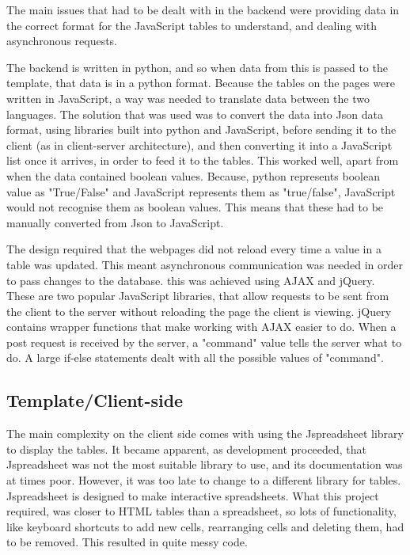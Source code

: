 \documentclass{l4proj}
\begin{document}
The main issues that had to be dealt with in the backend were providing data in the correct format for the JavaScript tables to understand, and dealing with asynchronous requests.

The backend is written in python, and so when data from this is passed to the template, that data is in a python format. Because the tables on the pages were written in JavaScript, a way was needed to translate data between the two languages. The solution that was used was to convert the data into Json data format, using libraries built into python and JavaScript, before sending it to the client (as in client-server architecture), and then converting it into a JavaScript list once it arrives, in order to feed it to the tables. This worked well, apart from when the data contained boolean values. Because, python represents boolean value as "True/False" and JavaScript represents them as "true/false", JavaScript would not recognise them as boolean values. This means that these had to be manually converted from Json to JavaScript.

The design required that the webpages did not reload every time a value in a table was updated. This meant asynchronous communication was needed in order to pass changes to the database. this was achieved using AJAX and jQuery. These are two popular JavaScript libraries, that allow requests to be sent from the client to the server without reloading the page the client is viewing. jQuery contains wrapper functions that make working with AJAX easier to do. When a post request is received by the server, a "command" value tells the server what to do. A large if-else statements dealt with all the possible values of "command".

\subsection{Template/Client-side}

The main complexity on the client side comes with using the Jspreadsheet library to display the tables. It became apparent, as development proceeded, that Jspreadsheet was not the most suitable library to use, and its documentation was at times poor. However, it was too late to change to a different library for tables. Jspreadsheet is designed to make interactive spreadsheets. What this project required, was closer to HTML tables than a spreadsheet, so lots of functionality, like keyboard shortcuts to add new cells, rearranging cells and deleting them, had to be removed. This resulted in quite messy code.
\end{document}

